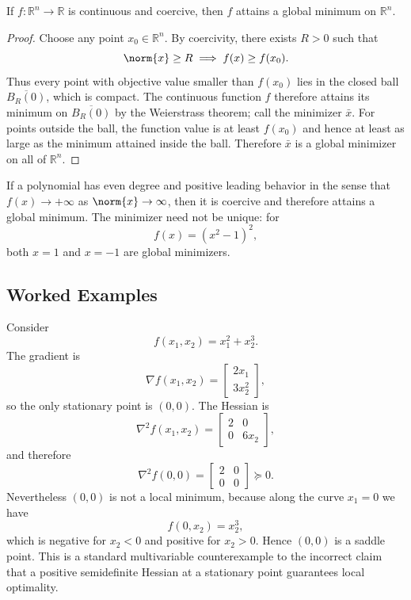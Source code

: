 \begin{theorem}\label{thm:l1-existence-of-global-minimizers-under-coercivity}
	If $f:\mathbb{R}^n \to \mathbb{R}$ is continuous and coercive, then $f$ attains a global minimum on $\mathbb{R}^n$.
\end{theorem}
\begin{proof}
	Choose any point $x_0 \in \mathbb{R}^n$. By coercivity, there exists $R>0$ such that
	\[
		\norm{x}\ge R \implies f(x)\ge f(x_0).
	\]
	Thus every point with objective value smaller than $f(x_0)$ lies in the closed ball $\overline{B_R(0)}$, which is compact. The continuous function $f$ therefore attains its minimum on $\overline{B_R(0)}$ by the Weierstrass theorem; call the minimizer $\bar x$. For points outside the ball, the function value is at least $f(x_0)$ and hence at least as large as the minimum attained inside the ball. Therefore $\bar x$ is a global minimizer on all of $\mathbb{R}^n$.
\end{proof}

\begin{remark}
	If a polynomial has even degree and positive leading behavior in the sense that $f(x)\to +\infty$ as $\norm{x}\to \infty$, then it is coercive and therefore attains a global minimum. The minimizer need not be unique: for
	\[
		f(x)=(x^2-1)^2,
	\]
	both $x=1$ and $x=-1$ are global minimizers.
\end{remark}

\subsection{Worked Examples}
\label{sec:l1-worked-examples}

\begin{eg}
	Consider
	\[
		f(x_1,x_2)=x_1^2+x_2^3.
	\]
	The gradient is
	\[
		\nabla f(x_1,x_2)=
		\begin{bmatrix}
			2x_1 \\
			3x_2^2
		\end{bmatrix},
	\]
	so the only stationary point is $(0,0)$. The Hessian is
	\[
		\nabla^2 f(x_1,x_2)=
		\begin{bmatrix}
			2 & 0 \\
			0 & 6x_2
		\end{bmatrix},
	\]
	and therefore
	\[
		\nabla^2 f(0,0)=
		\begin{bmatrix}
			2 & 0 \\
			0 & 0
		\end{bmatrix}
		\succeq 0.
	\]
	Nevertheless $(0,0)$ is not a local minimum, because along the curve $x_1=0$ we have
	\[
		f(0,x_2)=x_2^3,
	\]
	which is negative for $x_2<0$ and positive for $x_2>0$. Hence $(0,0)$ is a saddle point. This is a standard multivariable counterexample to the incorrect claim that a positive semidefinite Hessian at a stationary point guarantees local optimality.
\end{eg}

